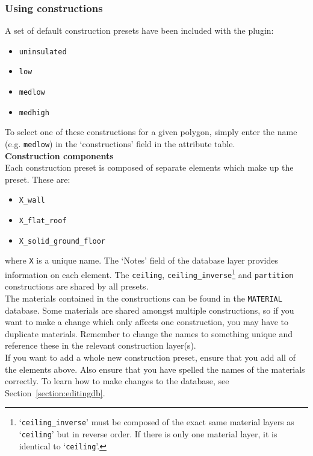 \documentclass{article}
\begin{document}
\subsubsection{Using constructions}
A set of default construction presets have been included with the plugin:
\begin{itemize}
    \item \texttt{uninsulated}
    \item \texttt{low}
    \item \texttt{medlow}
    \item \texttt{medhigh}
\end{itemize}
To select one of these constructions for a given polygon, simply enter the name (e.g. \texttt{medlow}) in the `constructions' field in the attribute table. \\

\textbf{Construction components} \\
Each construction preset is composed of separate elements which make up the preset. These are:
\begin{itemize}
    \item \texttt{X\_wall}
    \item \texttt{X\_flat\_roof}
    \item \texttt{X\_solid\_ground\_floor}
\end{itemize}
where \texttt{X} is a unique name. The `Notes' field of the database layer provides information on each element. The \texttt{ceiling}, \texttt{ceiling\_inverse}\footnote{`\texttt{ceiling\_inverse}' must be composed of the exact same material layers as `\texttt{ceiling}' but in reverse order. If there is only one material layer, it is identical to `\texttt{ceiling}'.} and \texttt{partition} constructions are shared by all presets. \\

The materials contained in the constructions can be found in the \texttt{MATERIAL} database. Some materials are shared amongst multiple constructions, so if you want to make a change which only affects one construction, you may have to duplicate materials. Remember to change the names to something unique and reference these in the relevant construction layer(s). \\

If you want to add a whole new construction preset, ensure that you add all of the elements above. Also ensure that you have spelled the names of the materials correctly. To learn how to make changes to the database, see Section~\ref{section:editingdb}.
\end{document}
